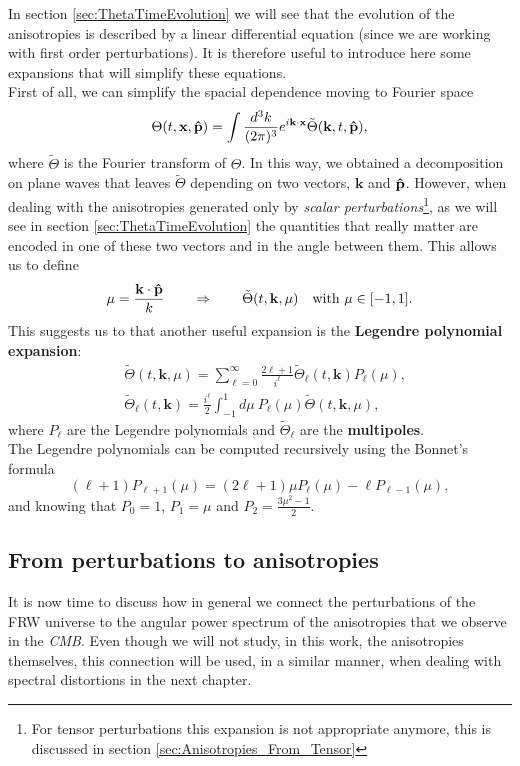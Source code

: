 In section \ref{sec:ThetaTimeEvolution} we will see that the evolution of the anisotropies is described by a linear differential equation (since we are working with first order perturbations). It is therefore useful to introduce here some expansions that will simplify these equations.\\
First of all, we can simplify the spacial dependence moving to Fourier space
\begin{equation}\label{eq:fourier_expansion}
    \Theta(t,\mathbf x,\mathbf{\hat{p}}) = \int \frac{d^3k}{(2\pi)^3}e^{i\mathbf{k}\cdot\mathbf{x}}\tilde\Theta(\mathbf{k},t,\mathbf{\hat{p}}),
\end{equation} 
where $\tilde\Theta$ is the Fourier transform of $\Theta$.
In this way, we obtained a decomposition on plane waves that leaves $\tilde\Theta$ depending on two vectors, $\mathbf k$ and $\mathbf{\hat{p}}$. However, when dealing with the anisotropies generated only by \emph{scalar perturbations}\footnote{For tensor perturbations this expansion is not appropriate anymore, this is discussed in section \ref{sec:Anisotropies_From_Tensor}}, as we will see in section \ref{sec:ThetaTimeEvolution} the quantities that really matter are encoded in one of these two vectors and in the angle between them. This allows us to define $$\mu=\frac{\mathbf{k}\cdot \mathbf{\hat{p}}}{k}\qquad\Rightarrow\qquad \tilde\Theta(t,\mathbf k,\mu)\quad \text{with } \mu\in[-1,1].$$
This suggests us to that another useful expansion is the \textbf{Legendre polynomial expansion}:
\begin{align}\label{eq:legendre_expansion}
    &\tilde\Theta(t,\mathbf k,\mu) = \sum_{\ell=0}^{\infty}\frac{2\ell+1}{i^\ell} \tilde\Theta_{\ell}(t,\mathbf{k})P_{\ell}(\mu),\\
    &\tilde\Theta_{\ell}(t,\mathbf{k}) =\frac{i^\ell}{2} \int_{-1}^{1}d\mu\ P_{\ell}(\mu)\tilde\Theta(t,\mathbf k,\mu)\nonumber,
\end{align} 
where $P_{\ell}$ are the Legendre polynomials and $\tilde\Theta_\ell$ are the \textbf{multipoles}.\\
The Legendre polynomials can be computed recursively using the Bonnet's formula
\begin{equation}\label{eq:bonnet}
    (\ell+1)P_{\ell+1}(\mu) = (2\ell+1)\mu P_{\ell}(\mu)-\ell P_{\ell-1}(\mu),
\end{equation}
and knowing that $P_0=1$, $P_1=\mu$ and $P_2=\frac{3\mu^2-1}{2}$.
\subsection{From perturbations to anisotropies}\label{sec:PertToAnis}
It is now time to discuss how in general we connect the perturbations of the FRW universe to the angular power spectrum of the anisotropies that we observe in the \emph{CMB}. Even though we will not study, in this work, the anisotropies themselves, this connection will be used, in a similar manner, when dealing with spectral distortions in the next chapter. 

